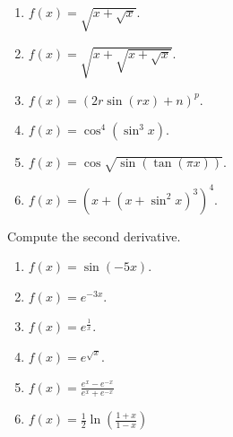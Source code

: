 \begin{problem}
\begin{multicols}{3}
\begin{enumerate}
\answer{$ $}
\item $\displaystyle f(x)= \sqrt{x+\sqrt{x}}$.

\answer{$ $}
\item $\displaystyle f(x)= \sqrt{x+\sqrt{x+\sqrt{x}}}$.

\answer{$ $}
\item $\displaystyle f(x)=(2r \sin (r x)+n)^p $.

\answer{$ $}
\item $\displaystyle f(x)=\cos^4(\sin^3 x) $.

\answer{$ $}
\item $\displaystyle f(x)=\cos \sqrt{\sin (\tan (\pi x))} $.

\answer{$ $}
\item $\displaystyle f(x)=\left(x+(x+\sin^2 x)^3 \right)^4 $.

\answer{$ $}
\end{enumerate}
\end{multicols}
\end{problem}
\begin{problem}Compute the second derivative.
\begin{multicols}{3}
\begin{enumerate}
\item $\displaystyle f(x)=\sin (-5x)$. 
\item $\displaystyle f(x)=e^{-3x}$. 
\item $\displaystyle f(x)=e^{\frac{1}x}$. 
\item $\displaystyle f(x)=e^{\sqrt{x}}$. 
\item $\displaystyle f(x)=\frac{e^{x}-e^{-x}}{e^x+e^{-x}} $
\item $\displaystyle f(x)=\frac{1}2\ln \left(\frac{1+x}{1-x}\right) $
\end{enumerate}
\end{multicols}
\end{problem}